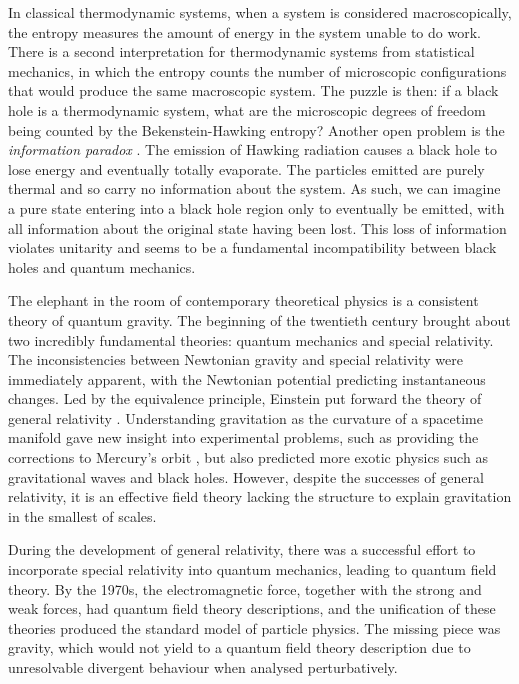 In classical thermodynamic systems, when a system is considered macroscopically, the entropy measures the amount of energy in the system unable to do work. There is a second interpretation for thermodynamic systems from statistical mechanics, in which the entropy counts the number of microscopic configurations that would produce the same macroscopic system. The puzzle is then: if a black hole is a thermodynamic system, what are the microscopic degrees of freedom being counted by the Bekenstein-Hawking entropy? Another open problem is the \emph{information paradox} \cite{Hawking:1976ra}. The emission of Hawking radiation causes a black hole to lose energy and eventually totally evaporate. The particles emitted are purely thermal and so carry no information about the system. As such, we can imagine a pure state entering into a black hole region only to eventually be emitted, with all information about the original state having been lost. This loss of information violates unitarity and seems to be a fundamental incompatibility between black holes and quantum mechanics.
 
 The elephant in the room of contemporary theoretical physics is a consistent theory of quantum gravity. The beginning of the twentieth century brought about two incredibly fundamental theories: quantum mechanics and special relativity. The inconsistencies between Newtonian gravity and special relativity were immediately apparent, with the Newtonian potential predicting instantaneous changes. Led by the equivalence principle, Einstein put forward the theory of general relativity \cite{Einstein:1914bx, Einstein:1915ca}. Understanding gravitation as the curvature of a spacetime manifold gave new insight into experimental problems, such as providing the corrections to Mercury's orbit \cite{Einstein:1915bz}, but also predicted more exotic physics such as gravitational waves and black holes. However, despite the successes of general relativity, it is an effective field theory lacking the structure to explain gravitation in the smallest of scales.  
 
During the development of general relativity, there was a successful effort to incorporate special relativity into quantum mechanics, leading to quantum field theory. By the 1970s, the electromagnetic force, together with the strong and weak forces, had quantum field theory descriptions, and the unification of these theories produced the standard model of particle physics. The missing piece was gravity, which would not yield to a quantum field theory description due to unresolvable divergent behaviour when analysed perturbatively.

